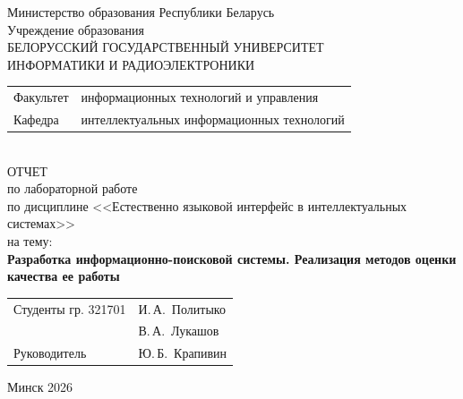 \begin{titlepage}
	\begin{center}
		Министерство образования Республики Беларусь\\[1em]
		Учреждение образования\\
		БЕЛОРУССКИЙ ГОСУДАРСТВЕННЫЙ УНИВЕРСИТЕТ \\
		ИНФОРМАТИКИ И РАДИОЭЛЕКТРОНИКИ\\[1em]
		
		\begin{minipage}{\textwidth}
			\begin{flushleft}
				\begin{tabular}{ l l }
					Факультет & информационных технологий и управления\\
					Кафедра   & интеллектуальных информационных технологий
				\end{tabular}
			\end{flushleft}
		\end{minipage}\\[1em]
		
		
		{ОТЧЕТ}\\
		{по лабораторной работе}\\
		{по дисциплине <<Естественно языковой интерфейс в интеллектуальных системах>>}\\
		{на тему:}\\[1em]
		\textbf{\large Разработка информационно-поисковой системы. Реализация методов
		оценки качества ее работы}\\[1em]
		
		
		\vspace{2em}
		\begin{tabular}{ p{}p{} }
			Студенты гр. 321701 & И.\,А.~Политыко \\
			& В.\,А.~Лукашов \\
			Руководитель & Ю.\,Б.~Крапивин \\

		\end{tabular}
		
		\vfill
		{\normalsize Минск 2026}
	\end{center}
\end{titlepage}
